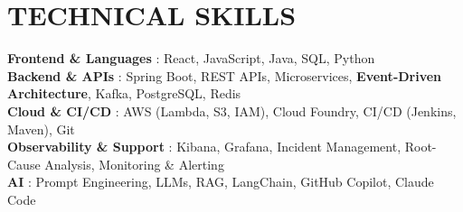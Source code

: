 \documentclass[a4paper,11pt]{article}
\begin{document}
\section{TECHNICAL SKILLS}
 \begin{itemize}[leftmargin=0in, label={}]
    \small{\item{
     \textbf{Frontend \& Languages} {: React, JavaScript, Java, SQL, Python}\vspace{2pt} \\
     \textbf{Backend \& APIs} {: Spring Boot, REST APIs, Microservices, \textbf{Event-Driven Architecture}, Kafka, PostgreSQL, Redis} \vspace{2pt} \\
     \textbf{Cloud \& CI/CD} {: AWS (Lambda, S3, IAM), Cloud Foundry, CI/CD (Jenkins, Maven), Git} \vspace{2pt} \\
     \textbf{Observability \& Support} {: Kibana, Grafana, Incident Management, Root-Cause Analysis, Monitoring \& Alerting} \vspace{2pt} \\
     \textbf{AI} {: Prompt Engineering, LLMs, RAG, LangChain, GitHub Copilot, Claude Code}
    }}
 \end{itemize}

 
\end{document}

